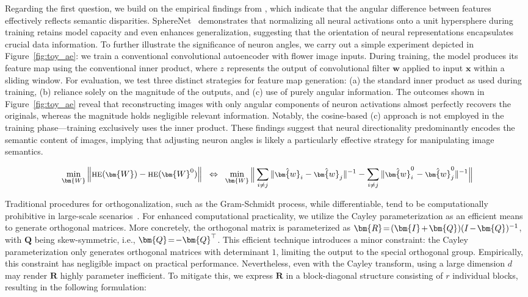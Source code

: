 \begin{itemize}[leftmargin=*,nosep]
Regarding the first question, we build on the empirical findings from \cite{liu2018decoupled,chen2020angular}, which indicate that the angular difference between features effectively reflects semantic disparities. SphereNet~\cite{liu2017deep} demonstrates that normalizing all neural activations onto a unit hypersphere during training retains model capacity and even enhances generalization, suggesting that the orientation of neural representations encapsulates crucial data information. To further illustrate the significance of neuron angles, we carry out a simple experiment depicted in Figure~\ref{fig:toy_ae}: we train a conventional convolutional autoencoder with flower image inputs. During training, the model produces its feature map using the conventional inner product, where $z$ represents the output of convolutional filter $\bm{w}$ applied to input $\bm{x}$ within a sliding window. For evaluation, we test three distinct strategies for feature map generation: (a) the standard inner product as used during training, (b) reliance solely on the magnitude of the outputs, and (c) use of purely angular information. The outcomes shown in Figure~\ref{fig:toy_ae} reveal that reconstructing images with only angular components of neuron activations almost perfectly recovers the originals, whereas the magnitude holds negligible relevant information. Notably, the cosine-based (c) approach is not employed in the training phase—training exclusively uses the inner product. These findings suggest that neural directionality predominantly encodes the semantic content of images, implying that adjusting neuron angles is likely a particularly effective strategy for manipulating image semantics.

\begin{equation}\label{eq:oft_principle}
\footnotesize
\min_{\bm{W}} \left\| \text{HE}(\bm{W})-\text{HE}(\bm{W}^0)\right\|~~\Leftrightarrow~~\min_{\bm{W}} \bigg{\|} \sum_{i\neq j} \|\hat{\bm{w}}_i-\hat{\bm{w}}_j\|^{-1}-\sum_{i\neq j} \|\hat{\bm{w}}^0_i-\hat{\bm{w}}^0_j\|^{-1}\bigg{\|}
\end{equation}

Traditional procedures for orthogonalization, such as the Gram-Schmidt process, while differentiable, tend to be computationally prohibitive in large-scale scenarios~\cite{liu2021orthogonal}. For enhanced computational practicality, we utilize the Cayley parameterization as an efficient means to generate orthogonal matrices. More concretely, the orthogonal matrix is parameterized as $\thickmuskip=2mu \medmuskip=2mu \bm{R}=(\bm{I}+\bm{Q})(I-\bm{Q})^{-1}$, with $\bm{Q}$ being skew-symmetric, i.e., $\thickmuskip=2mu \medmuskip=2mu \bm{Q}=-\bm{Q}^\top$. This efficient technique introduces a minor constraint: the Cayley parameterization only generates orthogonal matrices with determinant $1$, limiting the output to the special orthogonal group. Empirically, this constraint has negligible impact on practical performance. Nevertheless, even with the Cayley transform, using a large dimension $d$ may render $\bm{R}$ highly parameter inefficient. To mitigate this, we express $\bm{R}$ in a block-diagonal structure consisting of $r$ individual blocks, resulting in the following formulation:


\end{itemize}
